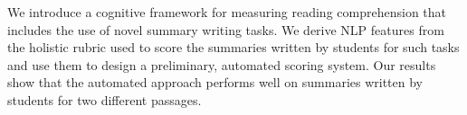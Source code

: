 We introduce a cognitive framework for measuring reading comprehension that includes the use of novel summary writing tasks. We derive NLP features from
 the holistic rubric used to score the summaries written by students for such
 tasks and use them to design a preliminary, automated scoring system. Our
 results show that the automated approach performs well on summaries written by
 students for two different passages.

